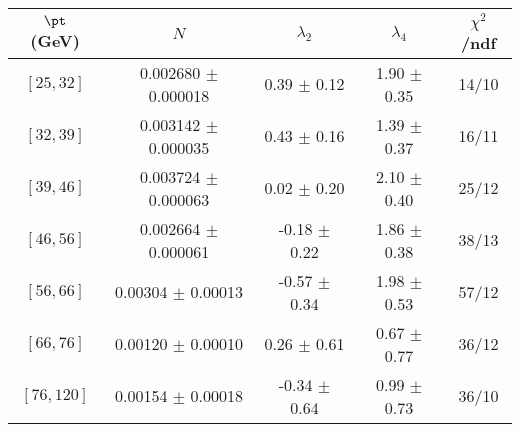 \begin{tabular}{c||c|c|c|c}
$\pt$ (GeV) & $N$ & $\lambda_{2}$ & $\lambda_4$  & $\chi^2$/ndf  \\
\hline
$[25, 32]$ & 0.002680 $\pm$ 0.000018 & 0.39 $\pm$ 0.12 & 1.90 $\pm$ 0.35 & 14/10\\
$[32, 39]$ & 0.003142 $\pm$ 0.000035 & 0.43 $\pm$ 0.16 & 1.39 $\pm$ 0.37 & 16/11\\
$[39, 46]$ & 0.003724 $\pm$ 0.000063 & 0.02 $\pm$ 0.20 & 2.10 $\pm$ 0.40 & 25/12\\
$[46, 56]$ & 0.002664 $\pm$ 0.000061 & -0.18 $\pm$ 0.22 & 1.86 $\pm$ 0.38 & 38/13\\
$[56, 66]$ & 0.00304 $\pm$ 0.00013 & -0.57 $\pm$ 0.34 & 1.98 $\pm$ 0.53 & 57/12\\
$[66, 76]$ & 0.00120 $\pm$ 0.00010 & 0.26 $\pm$ 0.61 & 0.67 $\pm$ 0.77 & 36/12\\
$[76, 120]$ & 0.00154 $\pm$ 0.00018 & -0.34 $\pm$ 0.64 & 0.99 $\pm$ 0.73 & 36/10\\
\end{tabular}

